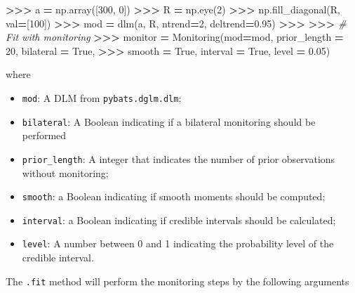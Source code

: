 \documentclass[
]{article}
\newenvironment{Shaded}{\begin{snugshade}}{\end{snugshade}}
\newcommand{\CommentTok}[1]{\textcolor[rgb]{0.56,0.35,0.01}{\textit{#1}}}
\newcommand{\DecValTok}[1]{\textcolor[rgb]{0.00,0.00,0.81}{#1}}
\newcommand{\FloatTok}[1]{\textcolor[rgb]{0.00,0.00,0.81}{#1}}
\newcommand{\NormalTok}[1]{#1}
\newcommand{\OperatorTok}[1]{\textcolor[rgb]{0.81,0.36,0.00}{\textbf{#1}}}
\newcommand{\VariableTok}[1]{\textcolor[rgb]{0.00,0.00,0.00}{#1}}
\providecommand{\tightlist}{%
  \setlength{\itemsep}{0pt}\setlength{\parskip}{0pt}}
\begin{document}
\begin{Shaded}
\begin{Highlighting}[]
\OperatorTok{\textgreater{}\textgreater{}\textgreater{}}\NormalTok{ a }\OperatorTok{=}\NormalTok{ np.array([}\DecValTok{300}\NormalTok{, }\DecValTok{0}\NormalTok{])}
\OperatorTok{\textgreater{}\textgreater{}\textgreater{}}\NormalTok{ R }\OperatorTok{=}\NormalTok{ np.eye(}\DecValTok{2}\NormalTok{)}
\OperatorTok{\textgreater{}\textgreater{}\textgreater{}}\NormalTok{ np.fill\_diagonal(R, val}\OperatorTok{=}\NormalTok{[}\DecValTok{100}\NormalTok{])}
\OperatorTok{\textgreater{}\textgreater{}\textgreater{}}\NormalTok{ mod }\OperatorTok{=}\NormalTok{ dlm(a, R, ntrend}\OperatorTok{=}\DecValTok{2}\NormalTok{, deltrend}\OperatorTok{=}\FloatTok{0.95}\NormalTok{)}
\OperatorTok{\textgreater{}\textgreater{}\textgreater{}} 
\OperatorTok{\textgreater{}\textgreater{}\textgreater{}} \CommentTok{\# Fit with monitoring}
\OperatorTok{\textgreater{}\textgreater{}\textgreater{}}\NormalTok{ monitor }\OperatorTok{=}\NormalTok{ Monitoring(mod}\OperatorTok{=}\NormalTok{mod, prior\_length }\OperatorTok{=} \DecValTok{20}\NormalTok{, bilateral }\OperatorTok{=} \VariableTok{True}\NormalTok{, }
\OperatorTok{\textgreater{}\textgreater{}\textgreater{}}\NormalTok{ smooth }\OperatorTok{=} \VariableTok{True}\NormalTok{, interval }\OperatorTok{=} \VariableTok{True}\NormalTok{, level }\OperatorTok{=} \FloatTok{0.05}\NormalTok{)}
\end{Highlighting}
\end{Shaded}

where

\begin{itemize}
\tightlist
\item
  \texttt{mod}: A DLM from \texttt{pybats.dglm.dlm};
\item
  \texttt{bilateral}: A Boolean indicating if a bilateral monitoring
  should be performed
\item
  \texttt{prior\_length}: A integer that indicates the number of prior
  observations without monitoring;
\item
  \texttt{smooth}: a Boolean indicating if smooth moments should be
  computed;
\item
  \texttt{interval}: a Boolean indicating if credible intervals should
  be calculated;
\item
  \texttt{level}: A number between 0 and 1 indicating the probability
  level of the credible interval.
\end{itemize}

The \texttt{.fit} method will perform the monitoring steps by the
following arguments
\end{document}
